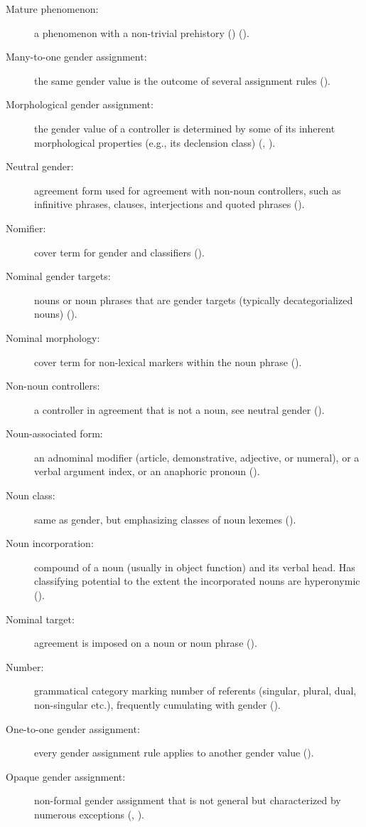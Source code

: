 \documentclass[output=collectionpaper]{langsci/langscibook}
\begin{document}
{\begin{description}
\item  [Mature phenomenon:] a phenomenon with a non-trivial prehistory (\citealt[2]{Dahl2004}) ().
\item  [Many-to-one gender assignment:] the same gender value is the outcome of several assignment rules ().
\item  [Morphological gender assignment:] the gender value of a controller is determined by some of its inherent morphological properties (e.g., its declension class) (, ).
\item  [Neutral gender:] agreement form used for agreement with non-noun controllers, such as infinitive phrases, clauses, interjections and quoted phrases ().
\item  [Nomifier:] cover term for gender and classifiers ().
\item  [Nominal gender targets:] nouns or noun phrases that are gender targets (typically decategorialized nouns) ().
%
\item  [Nominal morphology:] cover term for non-lexical markers within the noun phrase ().
\item  [Non-noun controllers:] a controller in agreement that is not a noun, see neutral gender ().
\item  [Noun-associated form:] an adnominal modifier (article, demonstrative, adjective, or numeral), or a verbal argument index, or an anaphoric pronoun ().
\item  [Noun class:] same as gender, but emphasizing classes of noun lexemes ().
\item  [Noun incorporation:] compound of a noun (usually in object function) and its verbal head. Has classifying potential to the extent the incorporated nouns are hyperonymic ().
\item  [Nominal target:] agreement is imposed on a noun or noun phrase ().
\item  [Number:] grammatical category marking number of referents (singular, plural, dual, non-singular etc.), frequently cumulating with gender ().
\item  [One-to-one gender assignment:] every gender assignment rule applies to another gender value ().
\item  [Opaque gender assignment:] non-formal gender assignment that is not general but characterized by numerous exceptions (, ).

\end{description}}
\end{document}
